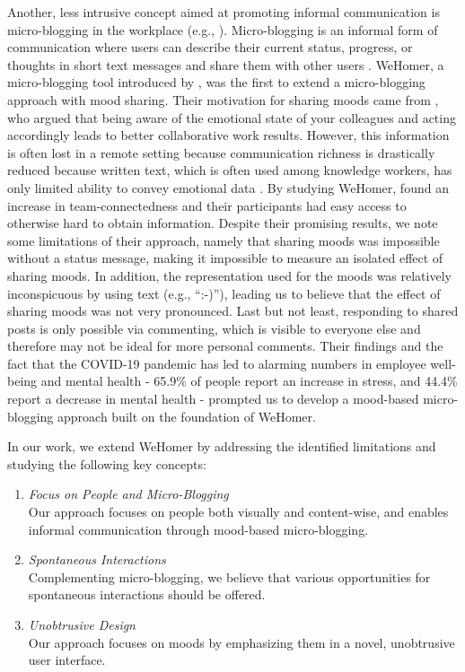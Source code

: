 Another, less intrusive concept aimed at promoting informal communication is micro-blogging in the workplace (e.g., \autocite{ebner2008microblogging, ehrlich2010microblogging, zhang2010case, dullemond2013fixing}). Micro-blogging is an informal form of communication where users can describe their current status, progress, or thoughts in short text messages and share them with other users \autocite{java2007we, dullemond2013fixing}. WeHomer, a micro-blogging tool introduced by \textcite{dullemond2013fixing}, was the first to extend a micro-blogging approach with mood sharing. Their motivation for sharing moods came from \textcite{garcia1999emotional}, who argued that being aware of the emotional state of your colleagues and acting accordingly leads to better collaborative work results.  However, this information is often lost in a remote setting because communication richness is drastically reduced because written text, which is often used among knowledge workers, has only limited ability to convey emotional data \autocite{hook2008interactional}. By studying WeHomer, \textcite{dullemond2013fixing} found an increase in team-connectedness and their participants had easy access to otherwise hard to obtain information. Despite their promising results, we note some limitations of their approach, namely that sharing moods was impossible without a status message, making it impossible to measure an isolated effect of sharing moods. In addition, the representation used for the moods was relatively inconspicuous by using text (e.g., \enquote{:-)}), leading us to believe that the effect of sharing moods was not very pronounced. Last but not least, responding to shared posts is only possible via commenting, which is visible to everyone else and therefore may not be ideal for more personal comments. Their findings and the fact that the COVID-19 pandemic has led to alarming numbers in employee well-being and mental health - 65.9\% of people report an increase in stress, and 44.4\% report a decrease in mental health \autocite{mswellbeing} - prompted us to develop a mood-based micro-blogging approach built on the foundation of WeHomer.

In our work, we extend WeHomer by addressing the identified limitations and studying the following key concepts:

\begin{enumerate}
    \item \textit{Focus on People and Micro-Blogging} \\
    Our approach focuses on people both visually and content-wise, and enables informal communication through mood-based micro-blogging.
    \item \textit{Spontaneous Interactions} \\
    Complementing micro-blogging, we believe that various opportunities for spontaneous interactions should be offered.
    \item \textit{Unobtrusive Design} \\ 
    Our approach focuses on moods by emphasizing them in a novel, unobtrusive user interface.
\end{enumerate}

